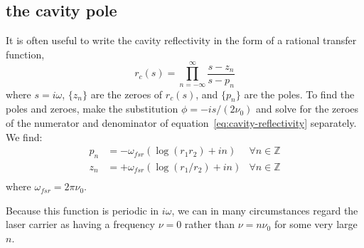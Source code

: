 \subsection{the cavity pole}
It is often useful to write the cavity reflectivity in the form of a
rational transfer function,
\begin{equation}
r_c(s) = \prod_{n=-\infty}^{\infty} \frac {s-z_n} {s-p_n}
\label{eq:rational-function}
\end{equation}
where $s=i\omega$, $\{z_n\}$ are the zeroes of $r_c(s)$, and $\{p_n\}$
are the poles.  To find the poles and zeroes, make the substitution
$\phi=-is/(2\nu_0)$ and solve for the zeroes of the numerator and
denominator of equation~\ref{eq:cavity-reflectivity} separately.  We find:
\begin{align}
p_n &= - \omega_{fsr} \left(\log\left(r_1 r_2\right) +  i n\right)  & \forall n\in \mathbb{Z}\\
z_n &= + \omega_{fsr} \left(\log\left(r_1/r_2\right) +  i n\right)  & \forall n\in \mathbb{Z}\\
\end{align}
where $\omega_{fsr}=2\pi\nu_0$.

Because this function is periodic in $i\omega$, we can in many
circumstances regard the laser carrier as having a frequency
$\nu=0$ rather than $\nu = n\nu_0$ for some very large $n$.

